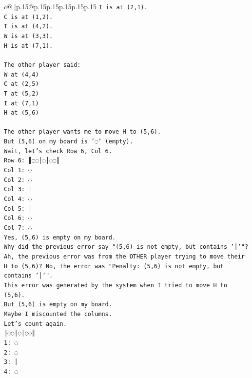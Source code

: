 \documentclass{article}
\begin{document}
{\begin{supertabular}{c@{$\;$}|p{.15\linewidth}@{}p{.15\linewidth}p{.15\linewidth}p{.15\linewidth}p{.15\linewidth}p{.15\linewidth}}
{{{\texttt{I is at (2,1).} \\
\texttt{C is at (1,2).} \\
\texttt{T is at (4,2).} \\
\texttt{W is at (3,3).} \\
\texttt{H is at (7,1).} \\
\\ 
\texttt{The other player said:} \\
\texttt{W at (4,4)} \\
\texttt{C at (2,5)} \\
\texttt{T at (5,2)} \\
\texttt{I at (7,1)} \\
\texttt{H at (5,6)} \\
\\ 
\texttt{The other player wants me to move H to (5,6).} \\
\texttt{But (5,6) on my board is '◌' (empty).} \\
\texttt{Wait, let's check Row 6, Col 6.} \\
\texttt{Row 6: ║◌◌│◌│◌◌║} \\
\texttt{Col 1: ◌} \\
\texttt{Col 2: ◌} \\
\texttt{Col 3: │} \\
\texttt{Col 4: ◌} \\
\texttt{Col 5: │} \\
\texttt{Col 6: ◌} \\
\texttt{Col 7: ◌} \\
\texttt{Yes, (5,6) is empty on my board.} \\
\texttt{Why did the previous error say "(5,6) is not empty, but contains '│'"?} \\
\texttt{Ah, the previous error was from the OTHER player trying to move their H to (5,6)? No, the error was "Penalty: (5,6) is not empty, but contains '│'".} \\
\texttt{This error was generated by the system when I tried to move H to (5,6).} \\
\texttt{But (5,6) is empty on my board.} \\
\texttt{Maybe I miscounted the columns.} \\
\texttt{Let's count again.} \\
\texttt{║◌◌│◌│◌◌║} \\
\texttt{1: ◌} \\
\texttt{2: ◌} \\
\texttt{3: │} \\
\texttt{4: ◌} \\
}}}
\end{supertabular}}
\end{document}
